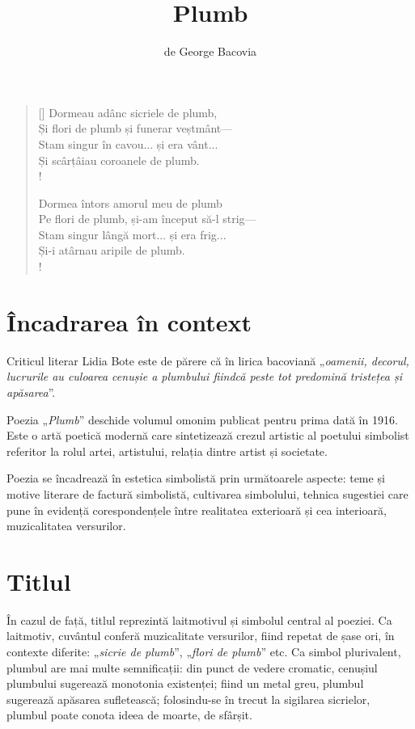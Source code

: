 \documentclass{article}
\title{Plumb}
\author{de George Bacovia}
\date{}
\newcommand{\qu}[1]{„\emph{#1}”}
\begin{document}
\maketitle

\settowidth{\versewidth}{Pe flori de plumb, și-am început să-l strig---}
\begin{verse}[\versewidth]
Dormeau adânc sicriele de plumb, \\
Și flori de plumb și funerar veștmânt--- \\
Stam singur în cavou... și era vânt... \\
Și scârțâiau coroanele de plumb. \\!

Dormea întors amorul meu de plumb \\
Pe flori de plumb, și-am început să-l strig--- \\
Stam singur lângă mort... și era frig... \\
Și-i atârnau aripile de plumb. \\!
\end{verse}

\section{Încadrarea în context}
Criticul literar Lidia Bote este de părere că în lirica bacoviană \qu{oamenii, decorul, lucrurile au culoarea cenușie a plumbului fiindcă peste tot predomină tristețea și apăsarea}.

Poezia \qu{Plumb} deschide volumul omonim publicat pentru prima dată în 1916. Este o artă poetică modernă care sintetizează crezul artistic al poetului simbolist referitor la rolul artei, artistului, relația dintre artist și societate.

Poezia se încadrează în estetica simbolistă prin următoarele aspecte: teme și motive literare de factură simbolistă, cultivarea simbolului, tehnica sugestiei care pune în evidență corespondențele între realitatea exterioară și cea interioară, muzicalitatea versurilor.

\section{Titlul}
În cazul de față, titlul reprezintă laitmotivul și simbolul central al poeziei. Ca laitmotiv, cuvântul conferă muzicalitate versurilor, fiind repetat de șase ori, în contexte diferite: \qu{sicrie de plumb}, \qu{flori de plumb} etc. Ca simbol plurivalent, plumbul are mai multe semnificații: din punct de vedere cromatic, cenușiul plumbului sugerează monotonia existenței; fiind un metal greu, plumbul sugerează apăsarea sufletească; folosindu-se în trecut la sigilarea sicrielor, plumbul poate conota ideea de moarte, de sfârșit.
\end{document}

